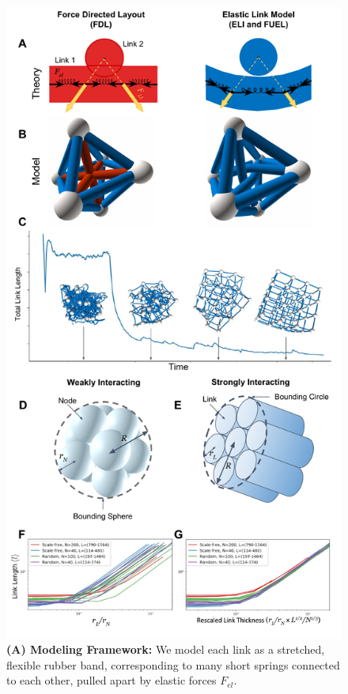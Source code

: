 \documentclass[endfloats,nofootinbib,preprint,floatfix,titlepage,superscriptaddress]{revtex4} %
\begin{document}
\linespread{1.5}

\begin{figure}
    \centering
    \includegraphics[width=.7\columnwidth]{fig-09-19/3d-crs-lat-trans-112017.pdf}
    \caption{
    \scriptsize
    {\bf(A) Modeling Framework:} We model each link as a stretched, flexible rubber band, 
    corresponding to many short springs connected to each other, pulled apart by
    elastic forces $F_{el}$. 
}
\end{figure}
\end{document}

